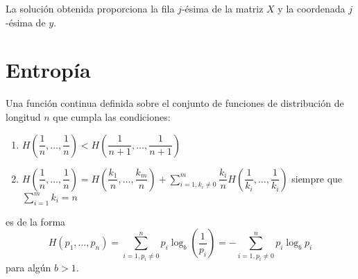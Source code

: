 La solución obtenida proporciona la fila $j$-ésima de la matriz $X$ y la coordenada $j$-ésima de $y$.
\section{Entropía}

\begin{teo}
    Una función continua definida sobre el conjunto de funciones de distribución de longitud $n$ que cumpla las condiciones:

    \begin{enumerate}[label=(\arabic*)]
        \item\label{item:l1-i1} $H\left(\dfrac{1}{n},\dots,\dfrac{1}{n}\right) < H\left(\dfrac{1}{n+1},\dots,\dfrac{1}{n+1}\right)$
        \item\label{item:l1-i2} $\displaystyle H\left(\dfrac{1}{n},\dots,\dfrac{1}{n}\right) = H\left(\dfrac{k_1}{n},\dots,\dfrac{k_m}{n}\right)+\sum_{i=1, k_i\neq 0}^m\dfrac{k_i}{n}H\left(\dfrac{1}{k_i},\dots,\dfrac{1}{k_i}\right)$ siempre que $\displaystyle \sum_{i=1}^mk_i=n$
    \end{enumerate}
    es de la forma
    $$H(p_1,\dots,p_n)=\sum_{i=1, p_i\ne 0}^np_i\log_b\left(\dfrac{1}{p_i}\right)=-\sum_{i=1, p_i\ne 0}^np_i\log_bp_i$$
    para algún $b>1$. 
\end{teo}

